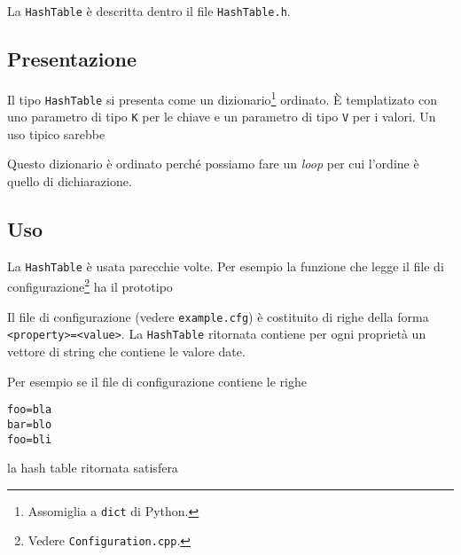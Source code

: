 \documentclass[a4paper,12pt]{article}
\newcommand{\info}[1]{\texttt{#1}}
\begin{document}
La \info{HashTable} è descritta dentro il file \info{HashTable.h}.

\subsection{Presentazione}

Il tipo \info{HashTable} si presenta come un dizionario\footnote{Assomiglia a \info{dict} di Python.} ordinato. È templatizato con uno parametro di tipo \info{K} per le chiave e un parametro di tipo \info{V} per i valori. Un uso tipico sarebbe



Questo dizionario è ordinato perché possiamo fare un \emph{loop} per cui l'ordine è quello di dichiarazione.



\subsection{Uso}

La \info{HashTable} è usata parecchie volte. Per esempio la funzione che legge il file di configurazione\footnote{Vedere \info{Configuration.cpp}.} ha il prototipo



Il file di configurazione (vedere \info{example.cfg}) è costituito di righe della forma \info{<property>=<value>}. La \info{HashTable} ritornata contiene per ogni proprietà un vettore di string che contiene le valore date.

Per esempio se il file di configurazione contiene le righe
\begin{verbatim}
foo=bla
bar=blo
foo=bli
\end{verbatim}
la hash table ritornata satisfera 



\end{document}
